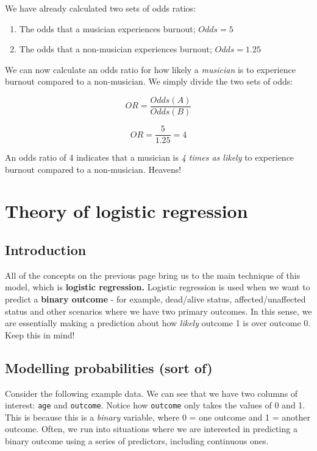 \documentclass[
]{book}
\providecommand{\tightlist}{%
  \setlength{\itemsep}{0pt}\setlength{\parskip}{0pt}}
\begin{document}
We have already calculated two sets of odds ratios:

\begin{enumerate}
\def\labelenumi{\alph{enumi})}
\tightlist
\item
  The odds that a musician experiences burnout; \(Odds = 5\)
\item
  The odds that a non-musician experiences burnout; \(Odds = 1.25\)
\end{enumerate}

We can now calculate an odds ratio for how likely a \emph{musician} is to experience burnout compared to a non-musician. We simply divide the two sets of odds:

\[
OR = \frac{Odds(A)}{Odds(B)}
\]

\[
OR = \frac{5}{1.25} = 4
\]

An odds ratio of 4 indicates that a musician is \emph{4 times as likely} to experience burnout compared to a non-musician. Heavens!

\hypertarget{theory-of-logistic-regression}{%
\section{Theory of logistic regression}\label{theory-of-logistic-regression}}

\hypertarget{introduction-6}{%
\subsection{Introduction}\label{introduction-6}}

All of the concepts on the previous page bring us to the main technique of this model, which is \textbf{logistic regression.} Logistic regression is used when we want to predict a \textbf{binary outcome} - for example, dead/alive status, affected/unaffected status and other scenarios where we have two primary outcomes. In this sense, we are essentially making a prediction about how \emph{likely} outcome 1 is over outcome 0. Keep this in mind!

\hypertarget{modelling-probabilities-sort-of}{%
\subsection{Modelling probabilities (sort of)}\label{modelling-probabilities-sort-of}}

Consider the following example data. We can see that we have two columns of interest: \texttt{age} and \texttt{outcome}. Notice how \texttt{outcome} only takes the values of 0 and 1. This is because this is a \emph{binary} variable, where 0 = one outcome and 1 = another outcome. Often, we run into situations where we are interested in predicting a binary outcome using a series of predictors, including continuous ones.
\end{document}
